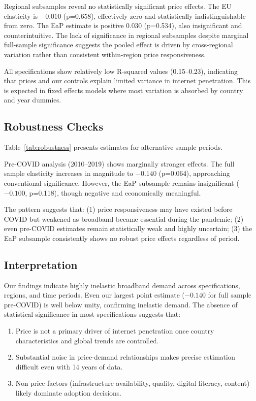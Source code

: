 \documentclass[12pt,review]{elsarticle}
\begin{document}
Regional subsamples reveal no statistically significant price effects. The EU elasticity is $-0.010$ (p=0.658), effectively zero and statistically indistinguishable from zero. The EaP estimate is positive $0.030$ (p=0.534), also insignificant and counterintuitive. The lack of significance in regional subsamples despite marginal full-sample significance suggests the pooled effect is driven by cross-regional variation rather than consistent within-region price responsiveness.

All specifications show relatively low R-squared values (0.15--0.23), indicating that prices and our controls explain limited variance in internet penetration. This is expected in fixed effects models where most variation is absorbed by country and year dummies.

\subsection{Robustness Checks}

Table~\ref{tab:robustness} presents estimates for alternative sample periods.



Pre-COVID analysis (2010--2019) shows marginally stronger effects. The full sample elasticity increases in magnitude to $-0.140$ (p=0.064), approaching conventional significance. However, the EaP subsample remains insignificant ($-0.100$, p=0.118), though negative and economically meaningful.

The pattern suggests that: (1) price responsiveness may have existed before COVID but weakened as broadband became essential during the pandemic; (2) even pre-COVID estimates remain statistically weak and highly uncertain; (3) the EaP subsample consistently shows no robust price effects regardless of period.

\subsection{Interpretation}

Our findings indicate highly inelastic broadband demand across specifications, regions, and time periods. Even our largest point estimate ($-0.140$ for full sample pre-COVID) is well below unity, confirming inelastic demand. The absence of statistical significance in most specifications suggests that:

\begin{enumerate}
\item Price is not a primary driver of internet penetration once country characteristics and global trends are controlled.
\item Substantial noise in price-demand relationships makes precise estimation difficult even with 14 years of data.
\item Non-price factors (infrastructure availability, quality, digital literacy, content) likely dominate adoption decisions.
\end{enumerate}
\end{document}
